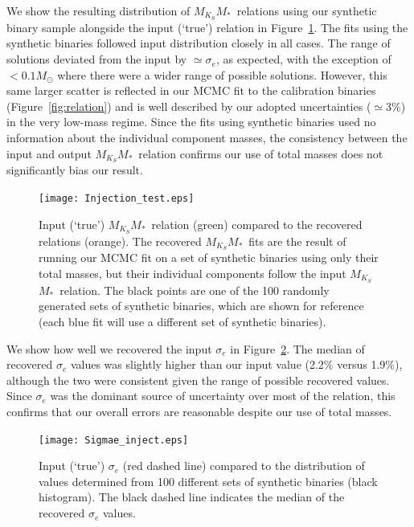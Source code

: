 \documentclass[twocolumn]{aastex62}
\newcommand{\mmk}{$M_{K_S}$\textendash$M_*$}
\begin{document}
We show the resulting distribution of \mmk\ relations using our synthetic binary sample alongside the input (`true') relation in Figure~\ref{fig:inject}. The fits using the synthetic binaries followed input distribution closely in all cases. The range of solutions deviated from the input by $\simeq\sigma_e$, as expected, with the exception of $<0.1M_\odot$ where there were a wider range of possible solutions. However, this same larger scatter is reflected in our MCMC fit to the calibration binaries (Figure~\ref{fig:relation}) and is well described by our adopted uncertainties ($\simeq3\%$) in the very low-mass regime. Since the fits using synthetic binaries used no information about the individual component masses, the consistency between the input and output \mmk\ relation confirms our use of total masses does not significantly bias our result.

\begin{figure}[h]
\begin{center}
\texttt{[image: Injection\_test.eps]}
\caption{Input (`true') \mmk\ relation (green) compared to the recovered relations (orange). The recovered \mmk\ fits are the result of running our MCMC fit on a set of synthetic binaries using only their total masses, but their individual components follow the input \mmk\ relation. The black points are one of the 100 randomly generated sets of synthetic binaries, which are shown for reference (each blue fit will use a different set of synthetic binaries). }
\label{fig:inject}
\end{center}
\end{figure}

We show how well we recovered the input $\sigma_e$ in Figure~\ref{fig:sigetest}. The median of recovered $\sigma_e$ values was slightly higher than our input value (2.2\% versus 1.9\%), although the two were consistent given the range of possible recovered values. Since $\sigma_e$ was the dominant source of uncertainty over most of the relation, this confirms that our overall errors are reasonable despite our use of total masses. 

\begin{figure}[h]
\begin{center}
\texttt{[image: Sigmae\_inject.eps]}
\caption{Input (`true') $\sigma_e$ (red dashed line) compared to the distribution of values determined from 100 different sets of synthetic binaries (black histogram). The black dashed line indicates the median of the recovered $\sigma_e$ values. }
\label{fig:sigetest}
\end{center}
\end{figure}
\end{document}
